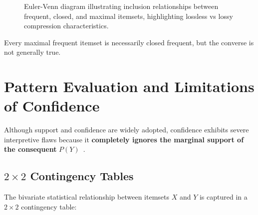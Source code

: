 \begin{figure}[htbp]
{%
}
\caption{Euler-Venn diagram illustrating inclusion relationships between frequent, closed, and maximal itemsets, highlighting lossless vs lossy compression characteristics.}
\label{fig:dm-venn-itemsets-en}
\end{figure}

Every maximal frequent itemset is necessarily closed frequent, but the converse is not generally true.

\section{Pattern Evaluation and Limitations of Confidence}
\label{sec:dm-pattern-evaluation-confidence-limits}

Although support and confidence are widely adopted, confidence exhibits severe interpretive flaws because it \textbf{completely ignores the marginal support of the consequent} $P(Y)$~\cite{tan2018}.

\subsection{$2 \times 2$ Contingency Tables}
The bivariate statistical relationship between itemsets $X$ and $Y$ is captured in a $2 \times 2$ contingency table:

\begin{table}[htbp]
\centering
\small
\renewcommand{\arraystretch}{1.2}
\caption{$2 \times 2$ contingency table for joint association analysis.}
\label{tab:dm-contingency-2x2-en}
\end{table}

